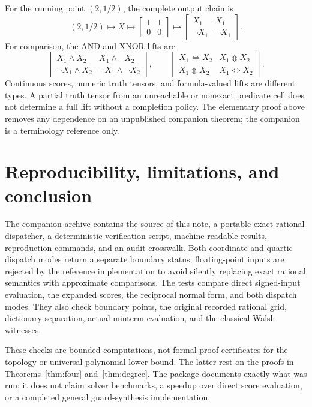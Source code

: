 \documentclass[11pt]{article}
\theoremstyle{definition}
\theoremstyle{remark}
\begin{document}
For the running point $(2,1/2)$, the complete output chain is
\[
 (2,1/2)\longmapsto X\longmapsto
 \begin{bmatrix}1&1\\0&0\end{bmatrix}
 \longmapsto
 \begin{bmatrix}X_1&X_1\\\neg X_1&\neg X_1\end{bmatrix}.
\]
For comparison, the AND and XNOR lifts are
\[
 \begin{bmatrix}
 X_1\wedge X_2&X_1\wedge\neg X_2\\
 \neg X_1\wedge X_2&\neg X_1\wedge\neg X_2
 \end{bmatrix},\qquad
 \begin{bmatrix}
 X_1\Leftrightarrow X_2&X_1\Updownarrow X_2\\
 X_1\Updownarrow X_2&X_1\Leftrightarrow X_2
 \end{bmatrix}.
\]
Continuous scores, numeric truth tensors, and formula-valued lifts are different types. A partial truth tensor from an unreachable or nonexact predicate cell does not determine a full lift without a completion policy. The elementary proof above removes any dependence on an unpublished companion theorem; the companion is a terminology reference only.

\section{Reproducibility, limitations, and conclusion}\label{sec:repro}

The companion archive contains the source of this note, a portable exact rational dispatcher, a deterministic verification script, machine-readable results, reproduction commands, and an audit crosswalk. Both coordinate and quartic dispatch modes return a separate boundary status; floating-point inputs are rejected by the reference implementation to avoid silently replacing exact rational semantics with approximate comparisons. The tests compare direct signed-input evaluation, the expanded scores, the reciprocal normal form, and both dispatch modes. They also check boundary points, the original recorded rational grid, dictionary separation, actual minterm evaluation, and the classical Walsh witnesses.

These checks are bounded computations, not formal proof certificates for the topology or universal polynomial lower bound. The latter rest on the proofs in Theorems~\ref{thm:four} and~\ref{thm:degree}. The package documents exactly what was run; it does not claim solver benchmarks, a speedup over direct score evaluation, or a completed general guard-synthesis implementation.
\end{document}

